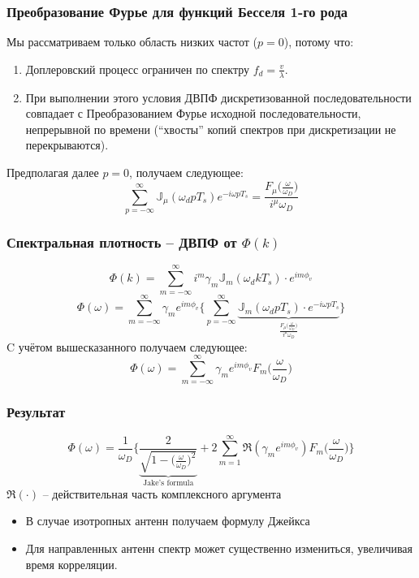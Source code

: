 \documentclass[utf8]{beamer}
\begin{document}
\begin{frame}
\frametitle {Преобразование Фурье для функций Бесселя 1-го рода}
Мы рассматриваем только область низких частот ($p=0$), потому что:
\begin{enumerate}
        \item Доплеровский процесс ограничен по спектру $f_d = \frac{v}{\lambda}$.
        \item При выполнении этого условия ДВПФ дискретизованной последовательности совпадает с Преобразованием Фурье исходной последовательности, непрерывной по времени (``хвосты'' копий спектров при дискретизации не перекрываются).
\end{enumerate}
Предполагая далее $p = 0$, получаем следующее:
$$
\sum_{p=-\infty}^{\infty} \mathbb{J}_\mu(\omega_d p T_s)e^{-i \omega p T_s} =\frac{F_\mu\big(\frac{\omega}{\omega_D}\big)}{i^\mu \omega_D}
$$
\end{frame}
\begin{frame}
\frametitle{Спектральная плотность -- ДВПФ от $\Phi(k)$}
$$
\Phi(k) = \sum_{m=-\infty}^{\infty} i^m \gamma_m \mathbb{J}_m (\omega_d k T_s)\cdot e^{im \phi_v}
$$
$$
\Phi(\omega) = \sum_{m=-\infty}^{\infty} \gamma_m e^{im\phi_v}\Big\{\sum_{p=-\infty}^{\infty}
\underbrace{
\mathbb{J}_m (\omega_d p T_s)\cdot e^{-i\omega p T_s}
}_{\frac{F_\mu\big(\frac{\omega}{\omega_D}\big)}{i^\mu \omega_D}}
\Big\}
$$
C учётом вышесказанного получаем следующее:
$$
\Phi(\omega) = \sum_{m=-\infty}^{\infty} \gamma_m e^{im\phi_v} {F_m\big(\frac{\omega}{\omega_D}\big)}
$$
\end{frame}
\begin{frame}
\frametitle{Результат}
$$
\Phi(\omega) = \frac{1}{\omega_D}\Bigg\{
\underbrace{
\frac{2}{\sqrt{1-\big(\frac{\omega}{\omega_D}\big)^2}}
}_{\textrm{Jake's formula}}+
2\sum_{m=1}^{\infty} \mathfrak{R}(\gamma_m e^{im\phi_v}) F_m\big(\frac{\omega}{\omega_D}\big)
\Bigg\}
$$
$\mathfrak{R}(\cdot)$ -- действительная часть комплексного аргумента
\begin{itemize}
        \item В случае изотропных антенн получаем формулу Джейкса
        \item Для направленных антенн спектр может существенно измениться, увеличивая время корреляции.
\end{itemize}
\end{frame}
\end{document}
